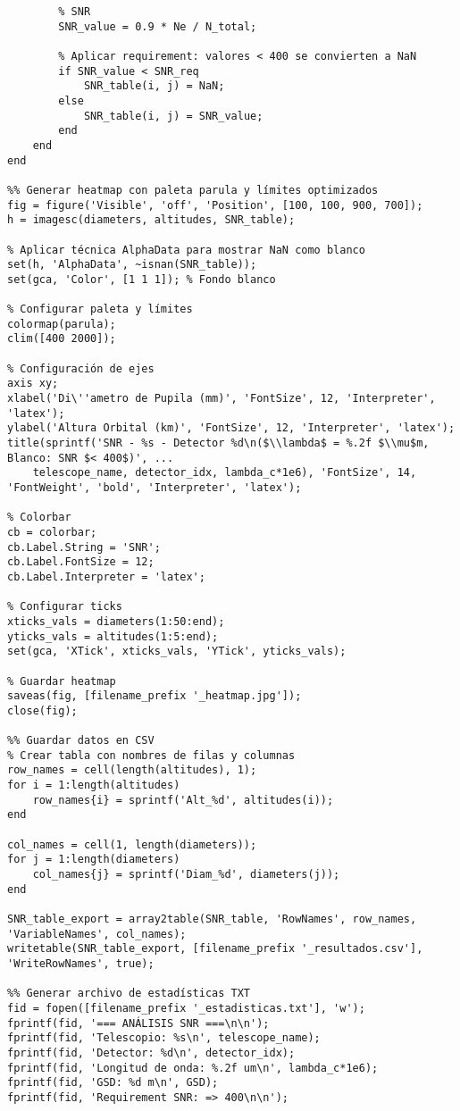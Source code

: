 \begin{verbatim}
        % SNR
        SNR_value = 0.9 * Ne / N_total;
        
        % Aplicar requirement: valores < 400 se convierten a NaN
        if SNR_value < SNR_req
            SNR_table(i, j) = NaN;
        else
            SNR_table(i, j) = SNR_value;
        end
    end
end

%% Generar heatmap con paleta parula y límites optimizados
fig = figure('Visible', 'off', 'Position', [100, 100, 900, 700]);
h = imagesc(diameters, altitudes, SNR_table);

% Aplicar técnica AlphaData para mostrar NaN como blanco
set(h, 'AlphaData', ~isnan(SNR_table));
set(gca, 'Color', [1 1 1]); % Fondo blanco

% Configurar paleta y límites
colormap(parula);
clim([400 2000]); 

% Configuración de ejes
axis xy;
xlabel('Di\''ametro de Pupila (mm)', 'FontSize', 12, 'Interpreter', 'latex');
ylabel('Altura Orbital (km)', 'FontSize', 12, 'Interpreter', 'latex');
title(sprintf('SNR - %s - Detector %d\n($\\lambda$ = %.2f $\\mu$m, Blanco: SNR $< 400$)', ...
    telescope_name, detector_idx, lambda_c*1e6), 'FontSize', 14, 'FontWeight', 'bold', 'Interpreter', 'latex');

% Colorbar
cb = colorbar;
cb.Label.String = 'SNR';
cb.Label.FontSize = 12;
cb.Label.Interpreter = 'latex';

% Configurar ticks
xticks_vals = diameters(1:50:end);
yticks_vals = altitudes(1:5:end);
set(gca, 'XTick', xticks_vals, 'YTick', yticks_vals);

% Guardar heatmap
saveas(fig, [filename_prefix '_heatmap.jpg']);
close(fig);

%% Guardar datos en CSV
% Crear tabla con nombres de filas y columnas
row_names = cell(length(altitudes), 1);
for i = 1:length(altitudes)
    row_names{i} = sprintf('Alt_%d', altitudes(i));
end

col_names = cell(1, length(diameters));
for j = 1:length(diameters)
    col_names{j} = sprintf('Diam_%d', diameters(j));
end

SNR_table_export = array2table(SNR_table, 'RowNames', row_names, 'VariableNames', col_names);
writetable(SNR_table_export, [filename_prefix '_resultados.csv'], 'WriteRowNames', true);

%% Generar archivo de estadísticas TXT
fid = fopen([filename_prefix '_estadisticas.txt'], 'w');
fprintf(fid, '=== ANÁLISIS SNR ===\n\n');
fprintf(fid, 'Telescopio: %s\n', telescope_name);
fprintf(fid, 'Detector: %d\n', detector_idx);
fprintf(fid, 'Longitud de onda: %.2f um\n', lambda_c*1e6);
fprintf(fid, 'GSD: %d m\n', GSD);
fprintf(fid, 'Requirement SNR: => 400\n\n');


\end{verbatim}
